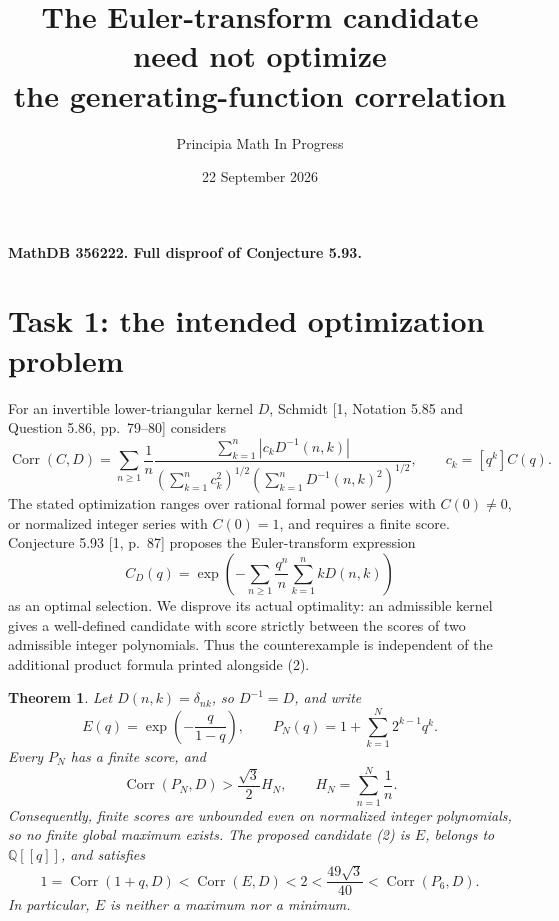 \documentclass[11pt]{article}
\title{The Euler-transform candidate need not optimize\\the generating-function correlation}
\author{Principia Math In Progress}
\date{22 September 2026}
\newtheorem{theorem}{Theorem}
\newcommand{\Corr}{\operatorname{Corr}}
\begin{document}
\maketitle
\noindent\textbf{MathDB 356222. Full disproof of Conjecture 5.93.}

\section*{Task 1: the intended optimization problem}
For an invertible lower-triangular kernel \(D\), Schmidt [1,
Notation 5.85 and Question 5.86, pp.~79--80] considers
\[
 \Corr(C,D)=\sum_{n\geq1}\frac1n
 \frac{\sum_{k=1}^n|c_k D^{-1}(n,k)|}
 {\left(\sum_{k=1}^nc_k^2\right)^{1/2}
  \left(\sum_{k=1}^nD^{-1}(n,k)^2\right)^{1/2}},
 \qquad c_k=[q^k]C(q).                                  \tag{1}
\]
The stated optimization ranges over rational formal power series with
\(C(0)\ne0\), or normalized integer series with \(C(0)=1\), and
requires a finite score. Conjecture 5.93 [1, p.~87] proposes
the Euler-transform expression
\[
 C_D(q)=\exp\left(-\sum_{n\geq1}
                    \frac{q^n}{n}\sum_{k=1}^n kD(n,k)\right)       \tag{2}
\]
as an optimal selection. We disprove its actual optimality:
an admissible kernel gives a well-defined candidate with score
strictly between the scores of two admissible integer polynomials.
Thus the counterexample is independent of the additional product
formula printed alongside (2).

\begin{theorem}
Let \(D(n,k)=\delta_{nk}\), so \(D^{-1}=D\), and write
\[
 E(q)=\exp\left(-\frac{q}{1-q}\right),\qquad
 P_N(q)=1+\sum_{k=1}^N2^{k-1}q^k .
\]
Every \(P_N\) has a finite score, and
\[
 \Corr(P_N,D)>\frac{\sqrt3}{2}H_N,\qquad
 H_N=\sum_{n=1}^N\frac1n.                                \tag{3}
\]
Consequently, finite scores are unbounded even on normalized
integer polynomials, so no finite global maximum exists.
The proposed candidate (2) is \(E\), belongs to
\(\mathbb Q[[q]]\), and satisfies
\[
 1=\Corr(1+q,D)<\Corr(E,D)<2
      <\frac{49\sqrt3}{40}<\Corr(P_6,D).                 \tag{4}
\]
In particular, \(E\) is neither a maximum nor a minimum.
\end{theorem}
\end{document}
